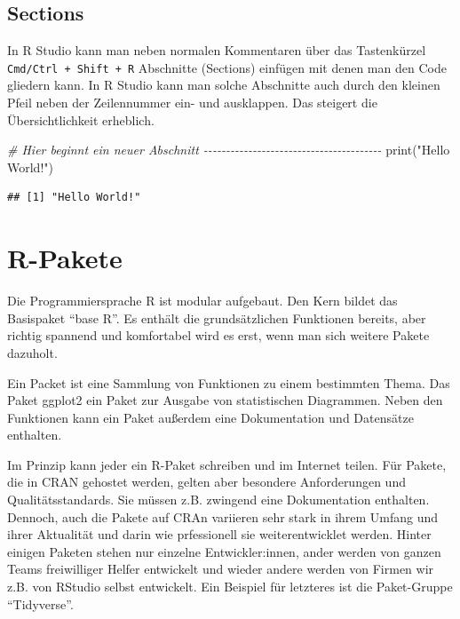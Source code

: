 \documentclass[
]{book}
\newenvironment{Shaded}{\begin{snugshade}}{\end{snugshade}}
\newcommand{\CommentTok}[1]{\textcolor[rgb]{0.56,0.35,0.01}{\textit{#1}}}
\newcommand{\FunctionTok}[1]{\textcolor[rgb]{0.00,0.00,0.00}{#1}}
\newcommand{\NormalTok}[1]{#1}
\newcommand{\StringTok}[1]{\textcolor[rgb]{0.31,0.60,0.02}{#1}}
\begin{document}
\hypertarget{sections}{%
\subsection{Sections}\label{sections}}

In R Studio kann man neben normalen Kommentaren über das Tastenkürzel \texttt{Cmd/Ctrl\ +\ Shift\ +\ R} Abschnitte (Sections) einfügen mit denen man den Code gliedern kann. In R Studio kann man solche Abschnitte auch durch den kleinen Pfeil neben der Zeilennummer ein- und ausklappen. Das steigert die Übersichtlichkeit erheblich.

\begin{Shaded}
\begin{Highlighting}[]
\CommentTok{\# Hier beginnt ein neuer Abschnitt {-}{-}{-}{-}{-}{-}{-}{-}{-}{-}{-}{-}{-}{-}{-}{-}{-}{-}{-}{-}{-}{-}{-}{-}{-}{-}{-}{-}{-}{-}{-}{-}{-}{-}{-}{-}{-}{-}{-}{-}}
\FunctionTok{print}\NormalTok{(}\StringTok{"Hello World!"}\NormalTok{)}
\end{Highlighting}
\end{Shaded}

\begin{verbatim}
## [1] "Hello World!"
\end{verbatim}

\hypertarget{r-pakete}{%
\section{R-Pakete}\label{r-pakete}}

Die Programmiersprache R ist modular aufgebaut. Den Kern bildet das Basispaket ``base R''. Es enthält die grundsätzlichen Funktionen bereits, aber richtig spannend und komfortabel wird es erst, wenn man sich weitere Pakete dazuholt.

Ein Packet ist eine Sammlung von Funktionen zu einem bestimmten Thema. Das Paket ggplot2 ein Paket zur Ausgabe von statistischen Diagrammen. Neben den Funktionen kann ein Paket außerdem eine Dokumentation und Datensätze enthalten.

Im Prinzip kann jeder ein R-Paket schreiben und im Internet teilen. Für Pakete, die in CRAN gehostet werden, gelten aber besondere Anforderungen und Qualitätsstandards. Sie müssen z.B. zwingend eine Dokumentation enthalten. Dennoch, auch die Pakete auf CRAn variieren sehr stark in ihrem Umfang und ihrer Aktualität und darin wie prfessionell sie weiterentwicklet werden. Hinter einigen Paketen stehen nur einzelne Entwickler:innen, ander werden von ganzen Teams freiwilliger Helfer entwickelt und wieder andere werden von Firmen wir z.B. von RStudio selbst entwickelt. Ein Beispiel für letzteres ist die Paket-Gruppe ``Tidyverse''.
\end{document}
